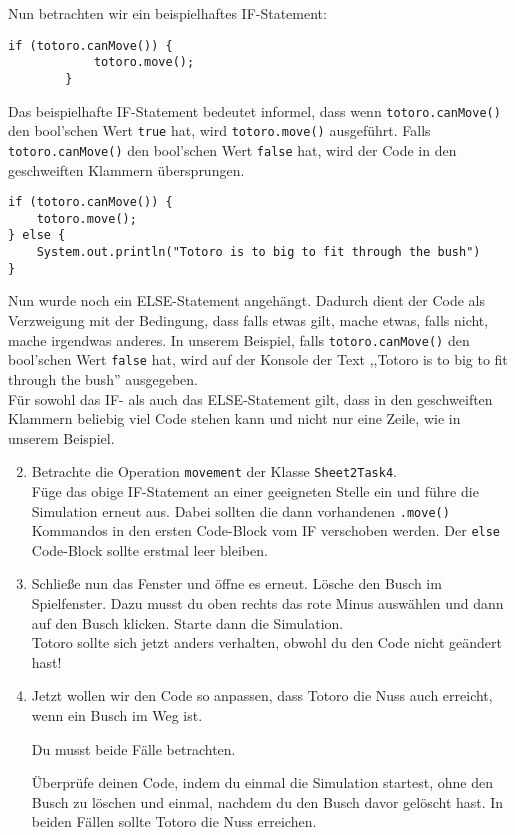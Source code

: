 \begin{Infobox}[IF-Verzweigung]
    Nun betrachten wir ein beispielhaftes IF-Statement:

    \begin{lstlisting}[breaklines=true, numbers=none]
        if (totoro.canMove()) {
            totoro.move();
        } 
    \end{lstlisting}

    Das beispielhafte IF-Statement bedeutet informel, dass wenn \lstinline{totoro.canMove()} den bool'schen Wert \lstinline{true} hat, wird \lstinline{totoro.move()} ausgeführt. 
    Falls \lstinline{totoro.canMove()} den bool'schen Wert \lstinline{false} hat, wird der Code in den geschweiften Klammern übersprungen.

    \begin{lstlisting}[breaklines=true, numbers=none]
if (totoro.canMove()) {
    totoro.move();
} else {
    System.out.println("Totoro is to big to fit through the bush")
}
    \end{lstlisting}

    Nun wurde noch ein ELSE-Statement angehängt. 
    Dadurch dient der Code als Verzweigung mit der Bedingung, dass falls etwas gilt, mache etwas, falls nicht, mache irgendwas anderes. 
    In unserem Beispiel, falls \lstinline{totoro.canMove()} den bool'schen Wert \lstinline{false} hat, wird auf der Konsole der Text ,,Totoro is to big to fit through the bush''  ausgegeben.\\

Für sowohl das IF- als auch das ELSE-Statement gilt, dass in den geschweiften Klammern beliebig viel Code stehen kann und  nicht nur eine Zeile, wie in unserem Beispiel.
\end{Infobox}


\begin{enumerate} \setcounter{enumi}{1}
    \item Betrachte die Operation \lstinline{movement} der Klasse \lstinline{Sheet2Task4}.\\
    Füge das obige IF-Statement an einer geeigneten Stelle ein und führe die Simulation erneut aus.
    Dabei sollten die dann  vorhandenen \lstinline{.move()} Kommandos in den ersten Code-Block vom IF verschoben werden.
    Der \lstinline{else} Code-Block sollte erstmal leer bleiben.
    \item Schließe nun das Fenster und öffne es erneut.
    Lösche den Busch im Spielfenster.
    Dazu musst du oben rechts das rote Minus auswählen und dann auf den Busch klicken.
    Starte dann die Simulation.\\
    Totoro sollte sich jetzt anders verhalten, obwohl du den Code nicht geändert hast!
    \item Jetzt wollen wir den Code so anpassen, dass Totoro die Nuss auch erreicht, wenn ein Busch im Weg ist.
    
    Du musst beide Fälle betrachten.

    Überprüfe deinen Code, indem du einmal die Simulation startest, ohne den Busch zu löschen und einmal, nachdem  du den Busch davor gelöscht hast.
    In beiden Fällen sollte Totoro die Nuss erreichen.

\end{enumerate}

